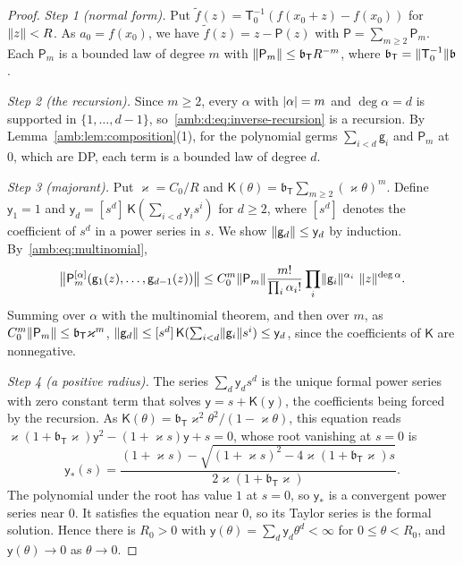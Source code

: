 \begin{proof}
\emph{Step 1 (normal form).} Put $\tilde f(z)=\mathsf T_0^{-1}(f(x_0+z)-f(x_0))$ for $\lVert z\rVert<R$. As $a_0=f(x_0)$, we have
$\tilde f(z)=z-\mathsf P(z)$ with $\mathsf P=\sum_{m\ge2}\mathsf P_m$. Each $\mathsf P_m$ is a bounded law of degree $m$ with
$\lVert \mathsf P_m\rVert\le \mathfrak b_{\mathsf T}R^{-m}$, where $\mathfrak b_{\mathsf T}=\lVert \mathsf T_0^{-1}\rVert\mathfrak b$.

\emph{Step 2 (the recursion).} Since $m\ge2$, every $\alpha$ with $\lvert \alpha\rvert=m$ and $\deg\alpha=d$ is supported in
$\{1,\dots,d-1\}$, so~\eqref{amb:d:eq:inverse-recursion} is a recursion. By Lemma~\ref{amb:lem:composition}(1), for the polynomial germs $\sum_{i<d}\mathsf g_i$ and $\mathsf P_m$ at $0$,
which are DP, each term is a bounded law of degree $d$.

\emph{Step 3 (majorant).} Put $\varkappa=C_0/R$ and $\mathsf K(\theta)=\mathfrak b_{\mathsf T}\sum_{m\ge2}(\varkappa\theta)^m$. Define $\mathsf y_1=1$ and
$\mathsf y_d=[s^d]\,\mathsf K(\sum_{i<d}\mathsf y_is^i)$ for $d\ge2$, where $[s^d]$ denotes the coefficient of $s^d$ in a power series in $s$. We show $\lVert \mathsf g_d\rVert\le\mathsf y_d$ by induction. By~\eqref{amb:eq:multinomial},
\[
 \bigl\lVert\mathsf P_m^{[\alpha]}(\mathsf g_1(z),\dots,\mathsf g_{d-1}(z))\bigr\rVert
 \le C_0^m\norm{\mathsf P_m}\frac{m!}{\prod_i\alpha_i!}\prod_i\norm{\mathsf g_i}^{\alpha_i}\ \norm z^{\deg\alpha}.
\]
Summing over $\alpha$ with the multinomial theorem, and then over $m$, as $C_0^m\lVert \mathsf P_m\rVert\le \mathfrak b_{\mathsf T}\varkappa^m$,
$\lVert \mathsf g_d\rVert\le[s^d]\,\mathsf K(\sum_{i<d}\lVert \mathsf g_i\rVert s^i)\le\mathsf y_d$, since the coefficients of $\mathsf K$ are
nonnegative.

\emph{Step 4 (a positive radius).} The series $\sum_d\mathsf y_ds^d$ is the unique formal power series with zero constant term that solves
$\mathsf y=s+\mathsf K(\mathsf y)$, the coefficients being forced by the recursion. As $\mathsf K(\theta)=\mathfrak b_{\mathsf T}\varkappa^2\theta^2/(1-\varkappa\theta)$, this equation
reads $\varkappa(1+\mathfrak b_{\mathsf T}\varkappa)\mathsf y^2-(1+\varkappa s)\mathsf y+s=0$, whose root vanishing at $s=0$ is
\[
 \mathsf y_*(s)=\frac{(1+\varkappa s)-\sqrt{(1+\varkappa s)^2-4\varkappa(1+\mathfrak b_{\mathsf T}\varkappa)s}}{2\varkappa(1+\mathfrak b_{\mathsf T}\varkappa)}.
\]
The polynomial under the root has value $1$ at $s=0$, so $\mathsf y_*$ is a convergent power series near $0$. It satisfies the
equation near $0$, so its Taylor series is the formal solution. Hence there is $R_0>0$ with
$\mathsf y(\theta)=\sum_d\mathsf y_d\theta^d<\infty$ for $0\le\theta<R_0$, and $\mathsf y(\theta)\to0$ as $\theta\to0$.


\end{proof}
